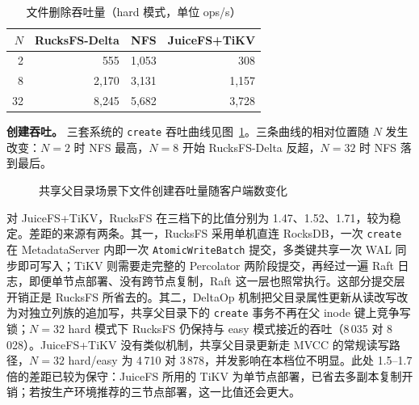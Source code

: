 \begin{table}[htbp]
    \centering
    \caption{文件删除吞吐量（hard 模式，单位 ops/s）}
    \label{tab:perf-remove-hard}
    \small
    \begin{tabular}{rrrr}
        \toprule
        $N$ & RucksFS-Delta & NFS & JuiceFS+TiKV \\
        \midrule
        2  & 555    & 1{,}053 & 308   \\
        8  & 2{,}170  & 3{,}131 & 1{,}157 \\
        32 & 8{,}245  & 5{,}682 & 3{,}728 \\
        \bottomrule
    \end{tabular}
\end{table}

\textbf{创建吞吐。} 三套系统的 \texttt{create} 吞吐曲线见图~\ref{fig:perf-create-curve}。三条曲线的相对位置随 $N$ 发生改变：$N=2$ 时 NFS 最高，$N=8$ 开始 RucksFS-Delta 反超，$N=32$ 时 NFS 落到最后。

\begin{figure}[htbp]
    \centering
    \caption{共享父目录场景下文件创建吞吐量随客户端数变化}
    \label{fig:perf-create-curve}
\end{figure}

对 JuiceFS+TiKV，RucksFS 在三档下的比值分别为 1.47、1.52、1.71，较为稳定。差距的来源有两条。其一，RucksFS 采用单机直连 RocksDB，一次 \texttt{create} 在 MetadataServer 内即一次 \texttt{AtomicWriteBatch} 提交，多类键共享一次 WAL 同步即可写入；TiKV 则需要走完整的 Percolator 两阶段提交，再经过一遍 Raft 日志，即便单节点部署、没有跨节点复制，Raft 这一层也照常执行。这部分提交层开销正是 RucksFS 所省去的。其二，DeltaOp 机制把父目录属性更新从读改写改为对独立列族的追加写，共享父目录下的 \texttt{create} 事务不再在父 inode 键上竞争写锁；$N=32$ hard 模式下 RucksFS 仍保持与 easy 模式接近的吞吐（8\,035 对 8\,028）。JuiceFS+TiKV 没有类似机制，共享父目录更新走 MVCC 的常规读写路径，$N=32$ hard/easy 为 4\,710 对 3\,878，并发影响在本档位不明显。此处 1.5--1.7 倍的差距已较为保守：JuiceFS 所用的 TiKV 为单节点部署，已省去多副本复制开销；若按生产环境推荐的三节点部署，这一比值还会更大。

